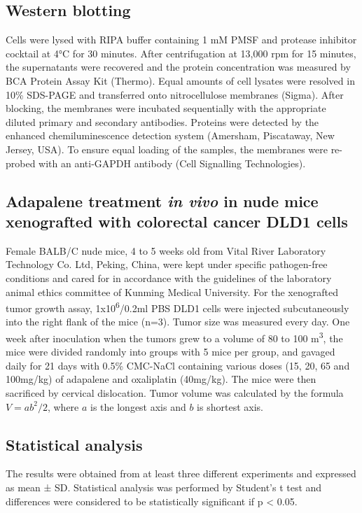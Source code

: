 \subsection{Western blotting}

Cells were lysed with RIPA buffer containing 1 mM PMSF and protease inhibitor cocktail at 4°C for 30 minutes. After centrifugation at 13,000 rpm for 15 minutes, the supernatants were recovered and the protein concentration was measured by BCA Protein Assay Kit (Thermo). Equal amounts of cell lysates were resolved in 10\% SDS-PAGE and transferred onto nitrocellulose membranes (Sigma). After blocking, the membranes were incubated sequentially with the appropriate diluted primary and secondary antibodies. Proteins were detected by the enhanced chemiluminescence detection system (Amersham, Piscataway, New Jersey, USA). To ensure equal loading of the samples, the membranes were re-probed with an anti-GAPDH antibody (Cell Signalling Technologies).

\subsection{Adapalene treatment \textit{in vivo} in nude mice xenografted with colorectal cancer DLD1 cells}

Female BALB/C nude mice, 4 to 5 weeks old from Vital River Laboratory Technology Co. Ltd, Peking, China, were kept under specific pathogen-free conditions and cared for in accordance with the guidelines of the laboratory animal ethics committee of Kunming Medical University. For the xenografted tumor growth assay, 1x10\textsuperscript{6}/0.2ml PBS DLD1 cells were injected subcutaneously into the right flank of the mice (n=3). Tumor size was measured every day. One week after inoculation when the tumors grew to a volume of 80 to 100 m\textsuperscript{3}, the mice were divided randomly into groups with 5 mice per group, and gavaged daily for 21 days with 0.5\% CMC-NaCl containing various doses (15, 20, 65 and 100mg/kg) of adapalene and oxaliplatin (40mg/kg). The mice were then sacrificed by cervical dislocation. Tumor volume was calculated by the formula $V=ab^2/2$, where $a$ is the longest axis and $b$ is shortest axis.

\subsection{Statistical analysis}

The results were obtained from at least three different experiments and expressed as mean ± SD. Statistical analysis was performed by Student’s t test and differences were considered to be statistically significant if p < 0.05.


